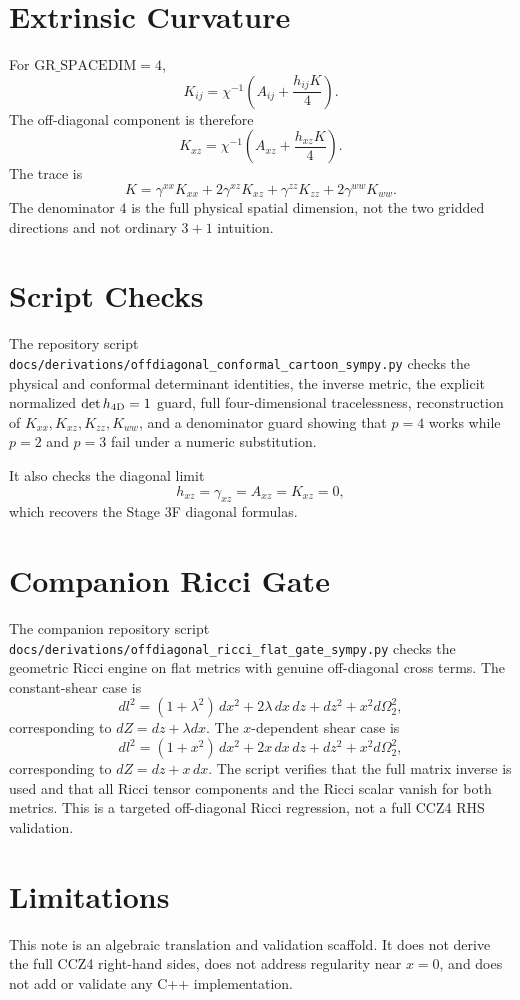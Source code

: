 \documentclass[11pt]{article}
\begin{document}
\section{Extrinsic Curvature}

For \(\mathrm{GR\_SPACEDIM}=4\),
\begin{equation}
  K_{ij}
  =
  \chi^{-1}
  \left(A_{ij}+\frac{h_{ij}K}{4}\right).
\end{equation}
The off-diagonal component is therefore
\begin{equation}
  K_{xz}
  =
  \chi^{-1}
  \left(A_{xz}+\frac{h_{xz}K}{4}\right).
\end{equation}
The trace is
\begin{equation}
  K
  =
  \gamma^{xx}K_{xx}
  +
  2\gamma^{xz}K_{xz}
  +
  \gamma^{zz}K_{zz}
  +
  2\gamma^{ww}K_{ww}.
\end{equation}
The denominator \(4\) is the full physical spatial dimension, not the two
gridded directions and not ordinary \(3+1\) intuition.

\section{Script Checks}

The repository script
\texttt{docs/derivations/offdiagonal\_conformal\_cartoon\_sympy.py}
checks the physical and conformal determinant identities, the inverse metric,
the explicit normalized \(\det h_{\rm 4D}=1\) guard, full four-dimensional
tracelessness, reconstruction of
\(K_{xx},K_{xz},K_{zz},K_{ww}\), and a denominator guard showing that \(p=4\)
works while \(p=2\) and \(p=3\) fail under a numeric substitution.

It also checks the diagonal limit
\begin{equation}
  h_{xz}=\gamma_{xz}=A_{xz}=K_{xz}=0,
\end{equation}
which recovers the Stage 3F diagonal formulas.

\section{Companion Ricci Gate}

The companion repository script
\texttt{docs/derivations/offdiagonal\_ricci\_flat\_gate\_sympy.py}
checks the geometric Ricci engine on flat metrics with genuine off-diagonal
cross terms. The constant-shear case is
\begin{equation}
  dl^2
  =
  (1+\lambda^2)\,dx^2
  +
  2\lambda\,dx\,dz
  +
  dz^2
  +
  x^2d\Omega_2^2,
\end{equation}
corresponding to \(dZ=dz+\lambda dx\). The \(x\)-dependent shear case is
\begin{equation}
  dl^2
  =
  (1+x^2)\,dx^2
  +
  2x\,dx\,dz
  +
  dz^2
  +
  x^2d\Omega_2^2,
\end{equation}
corresponding to \(dZ=dz+x\,dx\). The script verifies that the full matrix
inverse is used and that all Ricci tensor components and the Ricci scalar
vanish for both metrics. This is a targeted off-diagonal Ricci regression, not
a full CCZ4 RHS validation.

\section{Limitations}

This note is an algebraic translation and validation scaffold. It does not
derive the full CCZ4 right-hand sides, does not address regularity near
\(x=0\), and does not add or validate any C++ implementation.
\end{document}
